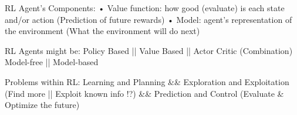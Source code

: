 RL Agent's Components:
• Value function: how good (evaluate) is each state and/or action (Prediction of future rewards) 
• Model: agent’s representation of the environment (What the environment will do next)

RL Agents might be:
Policy Based || Value Based || Actor Critic (Combination)
Model-free || Model-based

Problems within RL:
Learning and Planning \&\& Exploration and Exploitation (Find more || Exploit known info !?) \&\& Prediction and Control (Evaluate \& Optimize the future)